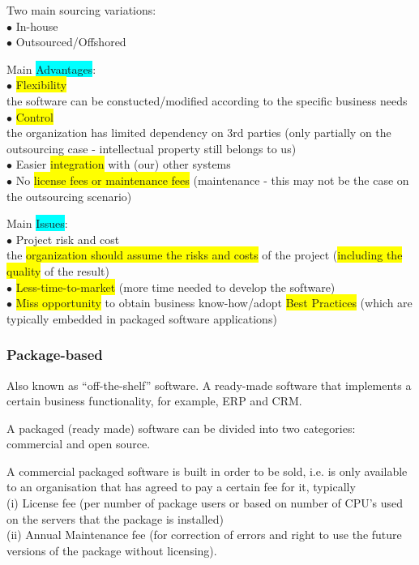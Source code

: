 \documentclass[]{project_plan}
\newcommand{\bulletPoint}{\hspace{-3.1pt}$\bullet$ \hspace{5pt}}
\begin{document}
Two main sourcing variations:\\
\bulletPoint In-house\\
\bulletPoint Outsourced/Offshored

Main \colorbox{cyan}{Advantages}:\\
\bulletPoint \colorbox{yellow}{Flexibility}\\the software can be constucted/modified according to the specific business needs\\
\bulletPoint \colorbox{yellow}{Control}\\the organization has limited dependency on 3rd parties (only partially on the outsourcing case - intellectual property still belongs to us)\\
\bulletPoint Easier \colorbox{yellow}{integration} with (our) other systems \\
\bulletPoint No \colorbox{yellow}{license fees or maintenance fees} (maintenance - this may not be the case on the outsourcing scenario)

Main \colorbox{cyan}{Issues}:\\
\bulletPoint  Project risk and cost\\the \colorbox{yellow}{organization should assume the risks and costs} of the project (\colorbox{yellow}{including the quality} of the result)\\
\bulletPoint  \colorbox{yellow}{Less-time-to-market} (more time needed to develop the software)\\
\bulletPoint  \colorbox{yellow}{Miss opportunity} to obtain business know-how/adopt \colorbox{yellow}{Best Practices} (which are typically embedded in packaged software applications)

\subsubsection{Package-based}
Also known as “off-the-shelf” software. A ready-made software that implements a certain
business functionality, for example, ERP and CRM.

A packaged (ready made) software can be divided into two categories: commercial and open source.

A commercial packaged software is built in order to be sold, i.e. is only available to an organisation that
has agreed to pay a certain fee for it, typically\\
(i) License fee (per number of package users or based on number of CPU’s used on the servers that the
package is installed)\\
(ii) Annual Maintenance fee (for correction of errors and right to use the future versions of the package
without licensing).
\end{document}
